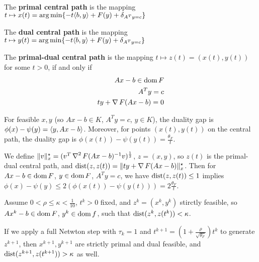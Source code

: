 \begin{thm}
  \label{sec:inter-point-meth-3}
  The \textbf{primal central path} is the mapping $t \mapsto x(t) =
  \argmin \{ -t \IP{b, y} + F(y) + \delta_{A^{T}y = c} \} $

  The \textbf{dual central path} is the mapping $t \mapsto y(t) =
  \argmin \{ -t \IP{b, y} + F(y) + \delta_{A^{T}y = c} \} $

  The \textbf{primal-dual central path} is the mapping $t \mapsto z(t)
  = (x(t), y(t))$ for some $t > 0$, if and only if
  \begin{align}
    \label{eq:52}
    Ax - b \in \operatorname*{dom} F \\
    \label{eq:53}
    A^{T} y = c \\
    \label{eq:54}
    ty + \operatorname*{\nabla} F(Ax - b) = 0
  \end{align}
\end{thm}

\begin{thm}
  \label{sec:inter-point-meth-4}
  For feasible $x, y$ (so $Ax - b \in K$, $A^{T}y = c$, $y \in K$),
  the duality gap is $\phi(x) - \psi(y) = \IP{y, Ax - b}$.  Moreover,
  for points $(x(t), y(t))$ on the central path, the duality gap is
  $\phi(x(t)) - \psi(y(t)) = \frac{\theta_{F}}{t}$.
\end{thm}

\begin{thm}
  \label{sec:inter-point-meth-5}
  We define $\| v \|_{x}^{\star} = (v^{T} \operatorname*{\nabla}^{2} F(Ax - b)^{-1}
  v)^{\frac{1}{2}}$, $z = (x, y)$, so $z(t)$ is the primal-dual
  central path, and $\operatorname*{dist}(z, z(t)) = \| ty + \operatorname*{\nabla} F(Ax -
  b)\|_{x}^{\star}$.
  Then for $Ax - b \in \operatorname*{dom} F$, $y \in \operatorname*{dom} F$, $A^{T}y = c$, we have
  $\operatorname*{dist}(z, z(t)) \leq 1$ implies $\phi(x) - \psi(y) \leq 2(\phi(x(t))
  - \psi(y(t))) = 2 \frac{\theta_{F}}{t}$.
\end{thm}

\begin{thm}
  \label{sec:inter-point-meth-6}
  Assume $0 < \rho \leq \kappa < \frac{1}{10}$, $t^{k} > 0$ fixed, and
  $z^{k} = (x^{k}, y^{k})$ stirctly feasible, so $Ax^{k} - b \in \operatorname*{dom}
  F$, $y^{k} \in \operatorname*{dom} f$, such that $\operatorname*{dist}(z^{k}, z(t^{k})) < \kappa$.

  If we apply a full Netwton step with $\tau_{k} = 1$ and $t^{k+1} = (1
  + \frac{\rho}{\sqrt{\theta_{F}}}) t^{k}$ to generate $z^{k+1}$, then
  $x^{k+1}, y^{k+1}$ are strictly primal and dual feasible, and
  $\operatorname*{dist}(z^{k+1}, z(t^{k+1})) > \kappa$ as well.
\end{thm}

